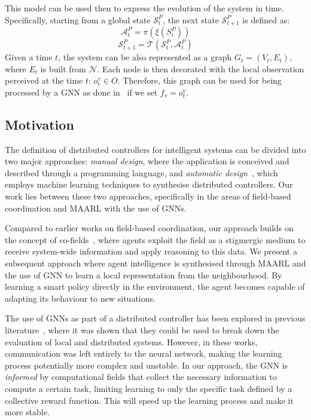 \documentclass[conference]{IEEEtran}
\begin{document}
This model can be used then to express the evolution of the system in time.
Specifically, starting from a global state $\mathcal{S}^P_t$, the next state $\mathcal{S}^P_{t+1}$ is defined as:
\begin{equation}
\mathcal{A}^P_t = \pi(\xi(S^P_t))
\end{equation}
\begin{equation}
\mathcal{S}^P_{t+1} = \mathcal{T}(\mathcal{S}^P_t, \mathcal{A}^P_t)
\end{equation}
Given a time $t$, the system can be also represented as a graph $G_t = (V_t, E_t)$, 
  where $E_t$ is built from $\mathcal{N}$.
  Each node is then decorated with the local observation perceived at the time $t$: $o^v_t \in O$. 
  Therefore, this graph can be used for being processed by a \ac{GNN} as done in~\cite{DBLP:conf/corl/TolstayaGPP0R19,tolstaya2020learning,DBLP:conf/icra/GosrichMLPYR022} if we set $f_v = o^v_t$.
\subsection{Motivation}
The definition of distributed controllers for intelligent systems can be divided into two major approaches: 
 \emph{manual design}, where the application is conceived and described through a programming language, 
 and \emph{automatic design}~\cite{brambilla2013swarm}, which employs machine learning techniques to synthesise distributed controllers. 
%
Our work lies between these two approaches, specifically in the areas of field-based coordination and \ac{MAARL} with the use of \acp{GNN}.

Compared to earlier works on field-based coordination, 
 our approach builds on the concept of co-fields~\cite{DBLP:journals/pervasive/MameiZL04}, 
 where agents exploit the field as a stigmergic medium to receive system-wide information and apply reasoning to this data.
%  
We present a subsequent approach where agent intelligence is synthesised through \ac{MAARL} and the use of \ac{GNN} to learn a local representation from the neighbourhood.
%
By learning a smart policy directly in the environment, the agent becomes capable of adapting its behaviour to new situations.

The use of \acp{GNN} as part of a distributed controller has been explored in previous literature~\cite{DBLP:conf/icra/GosrichMLPYR022,DBLP:conf/corl/TolstayaGPP0R19}, 
 where it was shown that they could be used to break down the evaluation of local and distributed systems. 
%
However, in these works, communication was left entirely to the neural network, 
 making the learning process potentially more complex and unstable. 
 In our approach, the \ac{GNN} is \emph{informed} by computational fields that collect the necessary information to compute a certain task, 
 limiting learning to only the specific task defined by a collective reward function.
 This will speed up the learning process and make it more stable.
\end{document}

